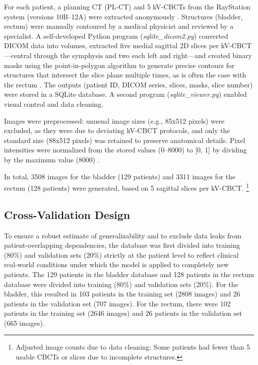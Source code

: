 \documentclass{article}
\begin{document}
For each patient, a planning CT (PL-CT) and 5 kV-CBCTs from the RayStation
system (versions 10B–12A) were extracted anonymously \citep{zwart2022}.
Structures (bladder, rectum) were manually contoured by a medical physicist and
reviewed by a specialist. A self-developed Python program
(\textit{sqlite\_dicom2.py}) \citep{rhone_repo} converted DICOM data into
volumes, extracted five medial sagittal 2D slices per kV-CBCT—central through
the symphysis and two each left and right—and created binary masks using the
point-in-polygon algorithm to generate precise contours for structures that
intersect the slice plane multiple times, as is often the case with the rectum
\citep{salomon1978}. The outputs (patient ID, DICOM series, slices, masks,
slice number) were stored in a SQLite database. A second program
(\textit{sqlite\_viewer.py}) \citep{rhone_repo} enabled visual control and data
cleaning.

Images were preprocessed: unusual image sizes (e.g., 85x512 pixels) were
excluded, as they were due to deviating kV-CBCT protocols, and only the
standard size (88x512 pixels) was retained to preserve anatomical details.
Pixel intensities were normalized from the stored values (0–8000) to [0, 1] by
dividing by the maximum value (8000) \citep{stevens2020}.

In total, 3508 images for the bladder (129 patients) and 3311 images for the
rectum (128 patients) were generated, based on 5 sagittal slices per kV-CBCT.
\footnote{Adjusted image counts due to data cleaning: Some patients had fewer
than 5 usable CBCTs or slices due to incomplete structures.}

\subsection{Cross-Validation Design}
To ensure a robust estimate of generalizability and to exclude data leaks from
patient-overlapping dependencies, the database was first divided into training
(80\%) and validation sets (20\%) strictly at the patient level to reflect
clinical real-world conditions under which the model is applied to completely
new patients. The 129 patients in the bladder database and 128 patients in the
rectum database were divided into training (80\%) and validation sets (20\%).
For the bladder, this resulted in 103 patients in the training set (2808
images) and 26 patients in the validation set (707 images). For the rectum,
there were 102 patients in the training set (2646 images) and 26 patients in
the validation set (665 images).
\end{document}
